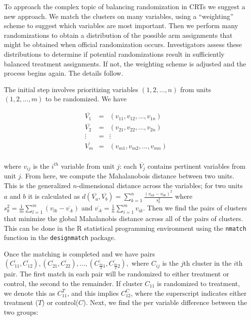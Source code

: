 \documentclass[]{article}
\begin{document}
To approach the complex topic of balancing randomization in CRTs we
suggest a new approach. We match the clusters on many variables, using a
``weighting'' scheme to suggest which variables are most important. Then
we perform many randomizations to obtain a distribution of the possible
arm assignments that might be obtained when official randomization
occurs. Investigators assess these distributions to determine if
potential randomizations result in sufficiently balanced treatment
assignments. If not, the weighting scheme is adjusted and the process
begins again. The details follow.

The initial step involves prioritizing variables \((1, 2,..., n)\) from
units \((1, 2, ..., m)\) to be randomized. We have

\begin{eqnarray*}
 \overline{V_1} & = & (v_{11}, v_{12},..., v_{1n})\\
 \overline{V_2} & = & (v_{21}, v_{22},..., v_{2n})\\
 \vdots & = & \vdots\\    
 \overline{V_m} & = & (v_{m1}, v_{m2},..., v_{mn})\\
\end{eqnarray*}

where \(v_{ij}\) is the \(i^{th}\) variable from unit \(j\): each
\(\overline{V_j}\) contains pertinent variables from unit \(j\). From
here, we compute the Mahalanobois distance between two units. This is
the generalized \(n\)-dimensional distance across the variables; for two
units \(a\) and \(b\) it is calculated as
\(d(\overline{V_a}, \overline{V_b}) = \sum_{k=1}^n \frac{(v_{ak} - v_{bk})^2}{s_k^2}\)
where
\(s_k^2 = \frac{1}{m} \sum_{l=1}^m(v_{lk} - \overline{v_{\cdot k}})\)
and \(\overline{v_{\cdot k}} = \frac{1}{n} \sum_{i = 1}^m v_{ik}\). Then
we find the pairs of clusters that minimize the global Mahalanobis
distance across all of the pairs of clusters. This can be done in the R
statistical programming environment \citep{R} using the \texttt{nmatch}
function in the \texttt{designmatch} \citep{nmatch} package.

Once the matching is completed and we have pairs
\((\overline{C_{11}}, \overline{C_{12}}), (\overline{C_{21}}, \overline{C_{22}}), ..., (\overline{C_{\frac{m}{2}1}}, \overline{C_{\frac{m}{2}2}}),\)
where \(C_{ij}\) is the \(j\)th cluster in the \(i\)th pair. The first
match in each pair will be randomized to either treatment or control,
the second to the remainder. If cluster \(C_{11}\) is randomized to
treatment, we denote this as \(C_{11}^T\), and this implies
\(C_{12}^C\), where the superscript indicates either treatment (\(T\))
or control(\(C\)). Next, we find the per variable difference between the
two groups:
\end{document}
